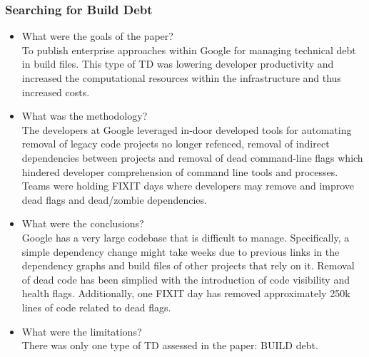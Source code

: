 \documentclass{mprop}
\begin{document}
\subsubsection{Searching for Build Debt} \cite{Morgenthaler2012}
\begin{itemize}
	\item What were the goals of the paper? \\
	      To publish enterprise approaches within Google for managing
	      technical debt in build files. This type of TD was lowering
	      developer productivity and increased the computational resources
	      within the infrastructure and thus increased costs.
	\item What was the methodology? \\
	      The developers at Google leveraged in-door developed tools for
	      automating removal of legacy code projects no longer refenced,
	      removal of indirect dependencies between projects and removal of
	      dead command-line flags which hindered developer comprehension of
	      command line tools and processes. Teams were holding FIXIT days
	      where developers may remove and improve dead flags and dead/zombie
	      dependencies.
	\item What were the conclusions? \\
	      Google has a very large codebase that is difficult to manage.
	      Specifically, a simple dependency change might take weeks due to
	      previous links in the dependency graphs and build files of other
	      projects that rely on it. Removal of dead code has been simplied
	      with the introduction of code visibility and health flags.
	      Additionally, one FIXIT day has removed approximately 250k lines of
	      code related to dead flags.
	\item What were the limitations? \\
	      There was only one type of TD assessed in the paper: BUILD debt.
\end{itemize}
\end{document}
